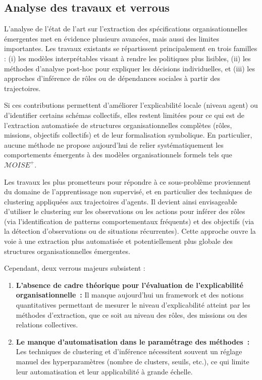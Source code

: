 \subsection*{Analyse des travaux et verrous}

L’analyse de l’état de l’art sur l’extraction des spécifications organisationnelles émergentes met en évidence plusieurs avancées, mais aussi des limites importantes. Les travaux existants se répartissent principalement en trois familles : (i) les modèles interprétables visant à rendre les politiques plus lisibles, (ii) les méthodes d’analyse post-hoc pour expliquer les décisions individuelles, et (iii) les approches d’inférence de rôles ou de dépendances sociales à partir des trajectoires.

Si ces contributions permettent d’améliorer l’explicabilité locale (niveau agent) ou d’identifier certains schémas collectifs, elles restent limitées pour ce qui est de l’extraction automatisée de structures organisationnelles complètes (rôles, missions, objectifs collectifs) et de leur formalisation symbolique. En particulier, aucune méthode ne propose aujourd’hui de relier systématiquement les comportements émergents à des modèles organisationnels formels tels que $\mathcal{M}OISE^+$.

Les travaux les plus prometteurs pour répondre à ce sous-problème proviennent du domaine de l’apprentissage non supervisé, et en particulier des techniques de clustering appliquées aux trajectoires d’agents. Il devient ainsi envisageable d’utiliser le clustering sur les observations ou les actions pour inférer des rôles (via l’identification de patterns comportementaux fréquents) et des objectifs (via la détection d’observations ou de situations récurrentes). Cette approche ouvre la voie à une extraction plus automatisée et potentiellement plus globale des structures organisationnelles émergentes.

Cependant, deux verrous majeurs subsistent :
\begin{enumerate}
    \item \textbf{L’absence de cadre théorique pour l’évaluation de l’explicabilité organisationnelle~:} Il manque aujourd’hui un framework et des notions quantitatives permettant de mesurer le niveau d’explicabilité atteint par les méthodes d’extraction, que ce soit au niveau des rôles, des missions ou des relations collectives.
    \item \textbf{Le manque d’automatisation dans le paramétrage des méthodes~:} Les techniques de clustering et d’inférence nécessitent souvent un réglage manuel des hyperparamètres (nombre de clusters, seuils, etc.), ce qui limite leur automatisation et leur applicabilité à grande échelle.
\end{enumerate}

